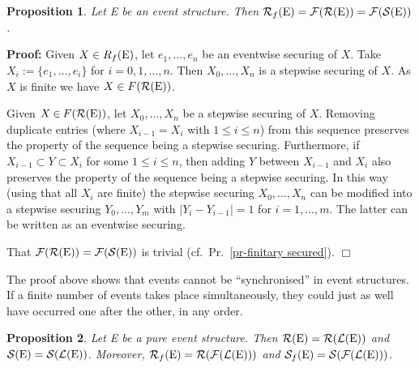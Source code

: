 \documentclass[twocolumn]{article}
\newtheorem{prop}{Proposition}[section]
\newenvironment{proposition}[1]{\begin{prop} \rm \label{pr-#1} }{\end{prop}}
\newenvironment{proof}{\begin{trivlist} \item[\hspace{\labelsep}\bf
Proof:]}{\hfill $\Box$\end{trivlist}}
\begin{document}
\begin{proposition}{finite reachable ES}
Let E be an event structure. Then ${\cal R}_f({\rm E})={\cal F}({\cal R}({\rm E}))={\cal F}({\cal S}({\rm E}))$.
\end{proposition}
\begin{proof}
Given $X\in R_f({\rm E})$, let $e_1,\ldots,e_n$ be an eventwise securing
of $X$. Take $X_i := \{e_1,\ldots,e_i\}$ for $i=0,1,\ldots,n$.  Then
$X_0,\ldots,X_n$ is a stepwise securing of $X$. As $X$ is finite we
have $X \in F({\cal R}({\rm E}))$.

Given $X \mathbin\in F({\cal R}({\rm E}))$, let $X_0,\ldots,X_n$ be a stepwise
securing of $X$. Removing duplicate entries (where $X_{i-1} = X_{i}$
with $1 \leq i \leq n$) from this sequence preserves the property of the
sequence being a stepwise securing. Furthermore, if $X_{i-1} \subset Y
\subset X_{i}$ for some $1 \leq i \leq n$, then adding $Y$ between
$X_{i-1}$ and $X_i$ also preserves the property of the sequence being
a stepwise securing. In this way (using that all $X_i$ are finite) the
stepwise securing $X_0,...,X_n$ can be modified into a stepwise
securing $Y_0,...,Y_m$ with $|Y_i-Y_{i-1}|=1$ for $i=1,...,m$.
The latter can be written as an eventwise securing.

That ${\cal F}({\cal R}({\rm E}))={\cal F}({\cal S}({\rm E}))$ is trivial (cf.~Pr.~\ref{pr-finitary secured}).
\end{proof}
The proof above shows that events cannot be ``synchronised'' in event
structures. If a finite number of events takes place simultaneously,
they could just as well have occurred one after the other, in any order.

\begin{proposition}{pure ES commute}
Let E be a pure event structure. Then
${\cal R}({\rm E})={\cal R}({\cal L}({\rm E}))$ and ${\cal S}({\rm E})={\cal S}({\cal L}({\rm E}))$.
Moreover, ${\cal R}_f({\rm E})={\cal R}({\cal F}({\cal L}({\rm E})))$ and
${\cal S}_f({\rm E})={\cal S}({\cal F}({\cal L}({\rm E})))$.
\end{proposition}
\end{document}
